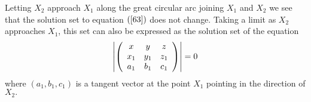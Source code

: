 \documentclass{ximera}
\begin{document}
Letting $X_{2}$ approach $X_{1}$ along the great circular arc joining $X_{1}$
and $X_{2}$ we see that the solution set to equation $\left(  \ref{63}\right)
$ does not change. Taking a limit as $X_{2}$ approaches $X_{1}$, this set can
also be expressed as the solution set of the equation%
\[
\left\vert \left(
\begin{array}
[c]{ccc}%
x & y & z\\
x_{1} & y_{1} & z_{1}\\
a_{1} & b_{1} & c_{1}%
\end{array}
\right)  \right\vert =0
\]
where $\left(  a_{1},b_{1},c_{1}\right)  $ is a tangent vector at the point
$X_{1}$ pointing in the direction of $X_{2}.$
\end{document}
